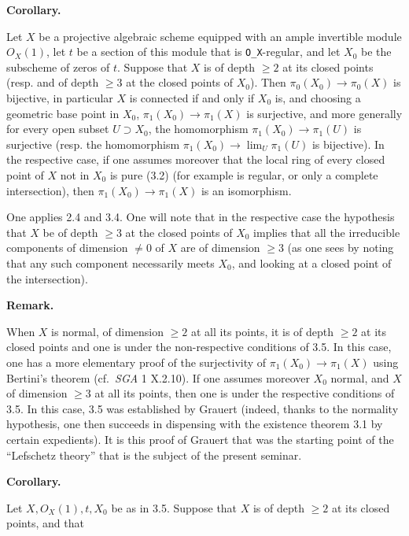 \documentclass[
  11pt,
  a4paper,
]{book}
\begin{document}
\textbf{Corollary.}

Let \(X\) be a projective algebraic scheme equipped with an ample
invertible module \(O_{X}(1)\), let \(t\) be a section of this module
that is \texttt{O\_X}-regular, and let \(X_{0}\) be the subscheme of
zeros of \(t\). Suppose that \(X\) is of depth \(\geqslant 2\) at its
closed points (resp. and of depth \(\geqslant 3\) at the closed points
of \(X_{0}\)). Then \(\pi_{0}(X_{0}) \to \pi_{0}(X)\) is bijective, in
particular \(X\) is connected if and only if \(X_{0}\) is, and choosing
a geometric base point in \(X_{0}\), \(\pi_{1}(X_{0}) \to \pi_{1}(X)\)
is surjective, and more generally for every open subset
\(U \supset X_{0}\), the homomorphism \(\pi_{1}(X_{0}) \to \pi_{1}(U)\)
is surjective (resp. the homomorphism
\(\pi_{1}(X_{0}) \to \lim_{U} \pi_{1}(U)\) is bijective). In the
respective case, if one assumes moreover that the local ring of every
closed point of \(X\) not in \(X_{0}\) is pure (3.2) (for example is
regular, or only a complete intersection), then
\(\pi_{1}(X_{0}) \to \pi_{1}(X)\) is an isomorphism.

One applies 2.4 and 3.4. One will note that in the respective case the
hypothesis that \(X\) be of depth \(\geqslant 3\) at the closed points
of \(X_{0}\) implies that all the irreducible components of dimension
\(\neq 0\) of \(X\) are of dimension \(\geqslant 3\) (as one sees by
noting that any such component necessarily meets \(X_{0}\), and looking
at a closed point of the intersection).

\textbf{Remark.}

When \(X\) is normal, of dimension \(\geqslant 2\) at all its points, it
is of depth \(\geqslant 2\) at its closed points and one is under the
non-respective conditions of 3.5. In this case, one has a more
elementary proof of the surjectivity of
\(\pi_{1}(X_{0}) \to \pi_{1}(X)\) using Bertini's theorem
(cf.~\emph{SGA} 1 X.2.10). If one assumes moreover \(X_{0}\) normal, and
\(X\) of dimension \(\geqslant 3\) at all its points, then one is under
the respective conditions of 3.5. In this case, 3.5 was established by
Grauert (indeed, thanks to the normality hypothesis, one then succeeds
in dispensing with the existence theorem 3.1 by certain expedients). It
is this proof of Grauert that was the starting point of the ``Lefschetz
theory'' that is the subject of the present seminar.

\textbf{Corollary.}

Let \(X, O_{X}(1), t, X_{0}\) be as in 3.5. Suppose that \(X\) is of
depth \(\geqslant 2\) at its closed points, and that
\end{document}
